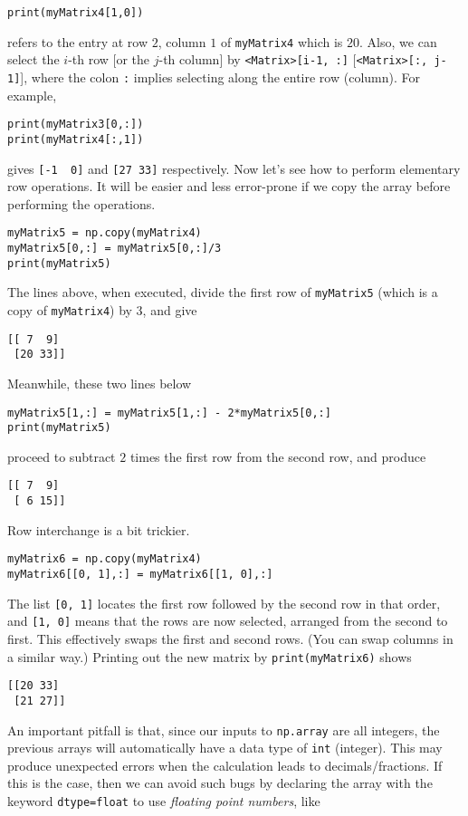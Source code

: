 \begin{lstlisting}
print(myMatrix4[1,0])
\end{lstlisting}
refers to the entry at row $2$, column $1$ of \verb|myMatrix4| which is $20$. Also, we can select the $i$-th row [or the $j$-th column] by \verb|<Matrix>[i-1, :]| [\verb|<Matrix>[:, j-1]|], where the colon \verb|:| implies selecting along the entire row (column). For example,
\begin{lstlisting}
print(myMatrix3[0,:])
print(myMatrix4[:,1])
\end{lstlisting}
gives
\verb|[-1  0]| and \verb|[27 33]| respectively. Now let's see how to perform elementary row operations. It will be easier and less error-prone if we copy the array before performing the operations.
\begin{lstlisting}
myMatrix5 = np.copy(myMatrix4)
myMatrix5[0,:] = myMatrix5[0,:]/3
print(myMatrix5)
\end{lstlisting}
The lines above, when executed, divide the first row of \verb|myMatrix5| (which is a copy of \verb|myMatrix4|) by $3$, and give
\begin{lstlisting}
[[ 7  9]
 [20 33]]    
\end{lstlisting}
Meanwhile, these two lines below
\begin{lstlisting}
myMatrix5[1,:] = myMatrix5[1,:] - 2*myMatrix5[0,:]
print(myMatrix5)
\end{lstlisting}
proceed to subtract $2$ times the first row from the second row, and produce
\begin{lstlisting}
[[ 7  9]
 [ 6 15]]
\end{lstlisting}
Row interchange is a bit trickier.
\begin{lstlisting}
myMatrix6 = np.copy(myMatrix4)
myMatrix6[[0, 1],:] = myMatrix6[[1, 0],:]
\end{lstlisting}
The list \verb|[0, 1]| locates the first row followed by the second row in that order, and \verb|[1, 0]| means that the rows are now selected, arranged from the second to first. This effectively swaps the first and second rows. (You can swap columns in a similar way.) Printing out the new matrix by \verb|print(myMatrix6)| shows
\begin{lstlisting}
[[20 33]
 [21 27]]
\end{lstlisting}
An important pitfall is that, since our inputs to \texttt{np.array} are all integers, the previous arrays will automatically have a data type of \texttt{int} (integer). This may produce unexpected errors when the calculation leads to decimals/fractions. If this is the case, then we can avoid such bugs by declaring the array with the keyword \verb|dtype=float| to use \textit{floating point numbers}, like
